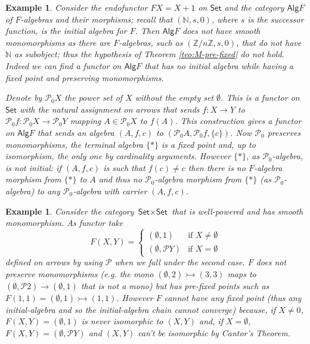 \documentclass[letterpaper, 11pt, oneside]{memoir}
\theoremstyle{myteo}
\newtheorem{example}[theorem]{Example}
\numberwithin{equation}{section}
\newcommand{\Alg}{\textsf{Alg}}
\newcommand{\Set}{\textsf{Set}}
\newcommand{\N}{\mathbb{N}}
\begin{document}
\begin{example}
  Consider the endofunctor \(FX = X + 1\) on \(\Set\) and the category \(\Alg F\) of \(F\)-algebras and their morphisms; recall that  \((\N, s, 0)\), where \(s\) is the successor function, is the initial algebra for \(F\).
  Then \(\Alg F\) does not have smooth monomorphisms as there are \(F\)-algebras, such as \((\mathbb{Z}/n\mathbb{Z}, s, 0)\), that do not have \(\N\) as subobject; thus the hypothesis of Theorem \ref{teo:M-pre-fixed} do not hold.
  Indeed we can find a functor on \(\Alg F\) that has no initial algebra while having a fixed point and preserving monomorphisms.

  Denote by \(\mathcal{P}_0X\) the power set of \(X\) without the empty set \(\emptyset\).
  This is a functor on \(\Set\) with the natural assignment on arrows that sends \(f : X \to Y\) to \(\mathcal{P}_0f : \mathcal{P}_0X \to \mathcal{P}_0Y\) mapping \(A \in \mathcal{P}_0X\) to \(f(A)\).
  This construction gives a functor on \(\Alg F\) that sends an algebra \((A, f, c)\) to \((\mathcal{P}_0A, \mathcal{P}_0f, \{c\})\).
  Now \(\mathcal{P}_0\) preserves monomorphisms, the terminal algebra \(\{*\}\) is a fixed point and, up to isomorphism, the only one by cardinality arguments.
  However \(\{*\}\), as \(\mathcal{P}_0\)-algebra, is not initial: if \((A, f, c)\) is such that \(f(c) \neq c\) then there is no \(F\)-algebra morphism from \(\{*\}\) to \(A\) and thus no \(\mathcal{P}_0\)-algebra morphism from \(\{*\}\) (as \(\mathcal{P}_0\)-algebra) to any \(\mathcal{P}_0\)-algebra with carrier \((A, f, c)\).
\end{example}

\begin{example}
  Consider the category \(\Set \times \Set\) that is well-powered and has smooth monomorphism.
  As functor take
  \begin{equation*}
    F(X, Y) = \begin{cases}
      (\emptyset, 1) & \text{if } X \neq \emptyset \\
      (\emptyset, \mathcal{P}Y) & \text{if } X = \emptyset
    \end{cases}
  \end{equation*}
  defined on arrows by using \(\mathcal{P}\) when we fall under the second case.
  \(F\) does not preserve monomorphisms (e.g. the mono \((\emptyset, 2) \rightarrowtail (3, 3)\) maps to \((\emptyset, \mathcal{P}2) \to (\emptyset, 1)\) that is not a mono) but has pre-fixed points such as \(F(1, 1) = (\emptyset, 1) \rightarrowtail (1, 1)\).
  However \(F\) cannot have any fixed point (thus any initial-algebra and so the initial-algebra chain cannot converge) because, if \(X \neq 0\), \(F(X, Y) = (\emptyset, 1)\) is never isomorphic to \((X, Y)\) and, if \(X = \emptyset\), \(F(X, Y) = (\emptyset, \mathcal{P}Y)\) and \((X, Y)\) can't be isomorphic by Cantor's Theorem. 
\end{example}
\end{document}
